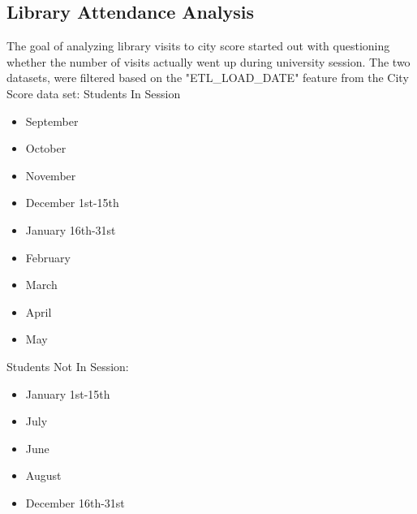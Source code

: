 \documentclass[journal, a4paper]{IEEEtran}
\begin{document}
\subsection{Library Attendance Analysis}
The goal of analyzing library visits to city score started out with questioning whether the number of visits actually went up during university session. The two datasets, were filtered based on the "ETL\_LOAD\_DATE" feature from the City Score data set:
\newline Students In Session
\begin{itemize}
    \item September
    \item October 
    \item November
    \item December 1st-15th
    \item January 16th-31st
    \item February
    \item March
    \item April
    \item May
\end{itemize}
Students Not In Session: 
\begin{itemize}
    \item January 1st-15th
    \item July
    \item June
    \item August
    \item December 16th-31st
\end{itemize}
\end{document}
